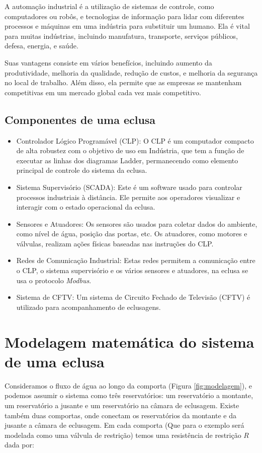 A automação industrial é a utilização de sistemas de controle, como computadores ou robôs, e tecnologias de informação para lidar com diferentes processos e máquinas em uma indústria para substituir um humano. Ela é vital para muitas indústrias, incluindo manufatura, transporte, serviços públicos, defesa, energia, e saúde.

Suas vantagens consiste em vários benefícios, incluindo aumento da produtividade, melhoria da qualidade, redução de custos, e melhoria da segurança no local de trabalho. Além disso, ela permite que as empresas se mantenham competitivas em um mercado global cada vez mais competitivo.

\subsection{Componentes de uma eclusa}

\begin{itemize}
	\item Controlador Lógico Programável (CLP): O CLP é um computador compacto de alta robustez com o objetivo de uso em Indústria, que tem a função de executar as linhas dos diagramas Ladder, permanecendo como elemento principal de controle do sistema da eclusa.
	\item Sistema Supervisório (SCADA): Este é um software usado para controlar processos industriais à distância. Ele permite aos operadores visualizar e interagir com o estado operacional da eclusa.
	\item Sensores e Atuadores: Os sensores são usados para coletar dados do ambiente, como nível de água, posição das portas, etc. Os atuadores, como motores e válvulas, realizam ações físicas baseadas nas instruções do CLP.	
    \item Redes de Comunicação Industrial: Estas redes permitem a comunicação entre o CLP, o sistema supervisório e os vários sensores e atuadores, na eclusa se usa o protocolo \textit{Modbus}.
    \item Sistema de CFTV: Um sistema de Circuito Fechado de Televisão (CFTV) é utilizado para acompanhamento de eclusagens.
\end{itemize}

\section{Modelagem matemática do sistema de uma eclusa}

Consideramos o fluxo de água ao longo da comporta (Figura \ref{fig:modelagem}), e podemos assumir o sistema como três reservatórios: um reservatório a montante, um reservatório a jusante e um reservatório na câmara de eclusagem. Existe também duas comportas, onde conectam os reservatórios da montante e da jusante a câmara de eclusagem. Em cada comporta (Que para o exemplo será modelada como uma válvula de restrição) temos uma resistência de restrição $R$ dada por:

